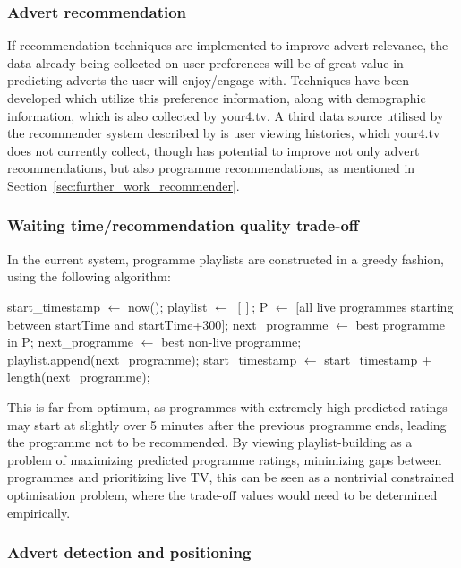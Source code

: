 	\subsubsection{Advert recommendation}

	If recommendation techniques are implemented to improve advert relevance, the data already being collected on user preferences will be of great value in predicting adverts the user will enjoy/engage with. Techniques have been developed \cite{contextual_advertising} which utilize this preference information, along with demographic \cite{contextual_advertising} information, which is also collected by your4.tv. A third data source utilised by the recommender system described by \cite{contextual_advertising} is user viewing histories, which your4.tv does not currently collect, though has potential to improve not only advert recommendations, but also programme recommendations, as mentioned in Section~\ref{sec:further_work_recommender}.

	\subsubsection{Waiting time/recommendation quality trade-off}
	In the current system, programme playlists are constructed in a greedy fashion, using the following algorithm:
	\begin{algorithmic}[H]
	\State start\_timestamp $\gets$ now();
	\State playlist $\gets$ $[]$;
		\State P $\gets$ $[$all live programmes starting between startTime and startTime+300$]$;
			\State next\_programme $\gets$ best programme in P;
		\Else
			\State next\_programme $\gets$ best non-live programme;
		\EndIf
		\State playlist.append(next\_programme);
		\State start\_timestamp $\gets$ start\_timestamp + length(next\_programme);
	\EndWhile
	\end{algorithmic}
	This is far from optimum, as programmes with extremely high predicted ratings may start at slightly over 5 minutes after the previous programme ends, leading the programme not to be recommended. By viewing playlist-building as a problem of maximizing predicted programme ratings, minimizing gaps between programmes and prioritizing live TV, this can be seen as a nontrivial constrained optimisation problem, where the trade-off values would need to be determined empirically.

	\subsubsection{Advert detection and positioning}

